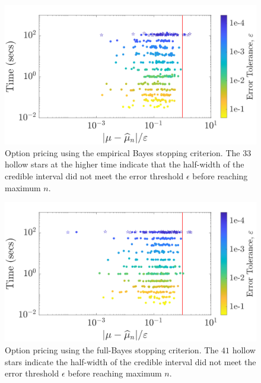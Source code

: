 \documentclass[graybox,footinfo]{svmult}
\begin{document}
\begin{figure}
\centering
\includegraphics[width=0.95\linewidth]{"figures/Sobol/Sobol_optPrice_guaranteed_time_MLE__d12_r1_2019-Sep-1"}
\caption[Sobol: Option pricing guaranteed:EB]{Option pricing using the empirical Bayes stopping criterion. The $33$ hollow stars at the higher time indicate that the half-width of the credible interval did not meet the error threshold $\epsilon$ before reaching maximum $n$.}
\label{FJ:fig:Sobol-optprice-guaranteed-EB}
\end{figure}
\begin{figure}
\centering
\includegraphics[width=0.95\linewidth]{"figures/Sobol/Sobol_optPrice_guaranteed_time_full__d12_r1_2019-Sep-1"}
\caption[Sobol: Option pricing guaranteed: Full Bayes]{Option pricing using the full-Bayes stopping criterion. The $41$ hollow stars indicate the half-width of the credible interval did not meet the error threshold $\epsilon$ before reaching maximum $n$.
}
\label{FJ:fig:Sobol-optprice-guaranteed-FB}
\end{figure}
\end{document}

